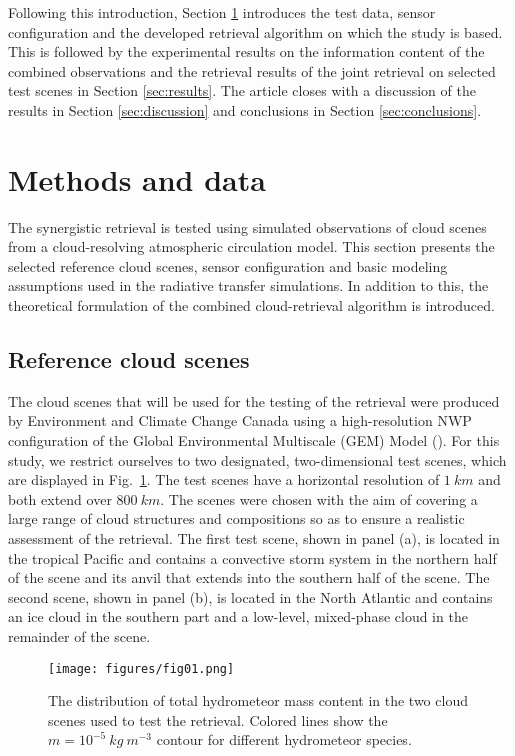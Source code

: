 \documentclass[journal abbreviation, manuscript]{copernicus}
\begin{document}
Following this introduction, Section \ref{sec:methods_and_data} introduces the
test data, sensor configuration and the developed retrieval algorithm on which
the study is based. This is followed by the experimental results on the
information content of the combined observations and the retrieval results of
the joint retrieval on selected test scenes in Section \ref{sec:results}. The
article closes with a discussion of the results in Section \ref{sec:discussion}
and conclusions in Section \ref{sec:conclusions}.


\section{Methods and data}
\label{sec:methods_and_data}

The synergistic retrieval is tested using simulated observations of cloud scenes
from a cloud-resolving atmospheric circulation model. This section presents the
selected reference cloud scenes, sensor configuration and basic modeling
assumptions used in the radiative transfer simulations. In addition to this, the
theoretical formulation of the combined cloud-retrieval algorithm is introduced.

\subsection{Reference cloud scenes}

The cloud scenes that will be used for the testing of the retrieval were
produced by Environment and Climate Change Canada using a high-resolution NWP
configuration of the Global Environmental Multiscale (GEM) Model
(\cite{cote98}). For this study, we restrict ourselves to two designated,
two-dimensional test scenes, which are displayed in Fig.~\ref{fig:overview}. The
test scenes have a horizontal resolution of $1\ \unit{km}$ and both extend over
$800\ \unit{km}$. The scenes were chosen with the aim of covering a large range
of cloud structures and compositions so as to ensure a realistic assessment of
the retrieval. The first test scene, shown in panel (a), is located in the
tropical Pacific and contains a convective storm system in the northern half of
the scene and its anvil that extends into the southern half of the scene. The
second scene, shown in panel (b), is located in the North Atlantic and contains
an ice cloud in the southern part and a low-level, mixed-phase cloud in the
remainder of the scene.

\begin{figure}[h!]
\centering
\texttt{[image: figures/fig01.png]}
\caption{The distribution of total hydrometeor mass content in the two
cloud scenes used to test the retrieval. Colored lines show the
 $m = 10^{-5}\  \unit{kg\ m^{-3}}$ contour for different
 hydrometeor species.}
\label{fig:overview}
\end{figure}
\end{document}
